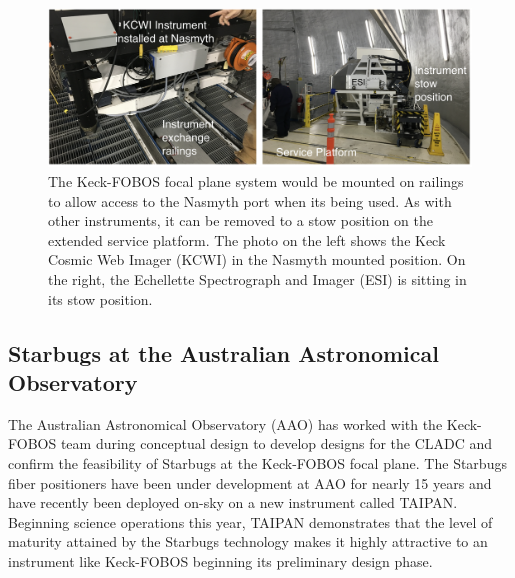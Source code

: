 \documentclass[oneside,11pt]{amsart}
\begin{document}
\begin{figure}[h!]
 \vskip -0.1in
 \includegraphics[width=\textwidth]{Keck_instrument_exchange.png}
 \caption{\small The Keck-FOBOS focal plane system would be mounted on railings to allow access to the Nasmyth port when its being used.  As with other instruments, it can be removed to a stow position on the extended service platform.  The photo on the left shows the Keck Cosmic Web Imager (KCWI) in the Nasmyth mounted position.  On the right, the Echellette Spectrograph and Imager (ESI) is sitting in its stow position. }\label{fig:keck_exchange}
\end{figure}

\subsection{Starbugs at the Australian Astronomical Observatory} %
\label{sec:AAO}

The Australian Astronomical Observatory (AAO) has worked with the Keck-FOBOS team during conceptual design to develop
designs for the CLADC and confirm the feasibility of Starbugs at the Keck-FOBOS focal plane.  The Starbugs fiber
positioners have been under development at AAO for nearly 15 years \citep[see][]{staszak16} and have recently been
deployed on-sky on a new instrument called TAIPAN.  Beginning science operations this year, TAIPAN
demonstrates that the level of maturity attained by the Starbugs technology makes it highly attractive to an instrument
like Keck-FOBOS beginning its preliminary design phase.
\end{document}
